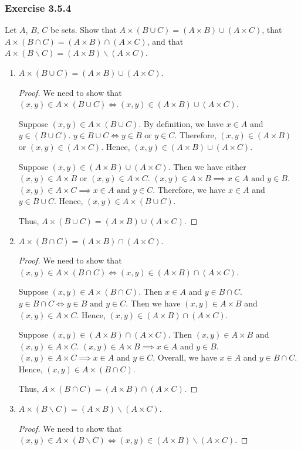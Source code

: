 \documentclass[12pt, letter]{article}
\begin{document}
\subsubsection*{Exercise 3.5.4}
Let $A$, $B$, $C$ be sets. Show that $A\times (B\cup C)=(A\times B)\cup (A\times C)$, that $A\times (B\cap C)=(A\times B)\cap (A\times C)$, and 
that $A\times (B\backslash C)=(A\times B)\backslash(A\times C)$.
\begin{enumerate}
    \item $A\times (B\cup C)=(A\times B)\cup (A\times C)$.
    \begin{proof}
        We need to show that $(x,y)\in A\times (B\cup C)\iff (x,y)\in (A\times B)\cup (A\times C)$.

        Suppose $(x,y)\in A\times (B\cup C)$. By definition, we have $x\in A$ and $y\in (B\cup C)$. $y\in B\cup C\iff y\in B\text{ or }y\in C$. 
        Therefore, $(x,y)\in (A\times B)$ or $(x,y)\in (A\times C)$. Hence, $(x,y)\in (A\times B)\cup (A\times C)$. 

        Suppose $(x,y)\in (A\times B)\cup (A\times C)$. Then we have either $(x,y)\in A\times B$ or $(x,y)\in A\times C$. 
        $(x,y)\in A\times B\implies x\in A\text{ and }y\in B$. $(x,y)\in A\times C\implies x\in A\text{ and }y\in C$. Therefore, we have $x\in A$ and $y\in B\cup C$. 
        Hence, $(x,y)\in A\times (B\cup C)$. 

        Thus, $A\times (B\cup C)=(A\times B)\cup (A\times C)$.
    \end{proof}
    \item $A\times (B\cap C)=(A\times B)\cap (A\times C)$.
    \begin{proof}
        We need to show that $(x,y)\in A\times (B\cap C)\iff (x,y)\in (A\times B)\cap (A\times C)$.

        Suppose $(x,y)\in A\times (B\cap C)$. Then $x\in A$ and $y\in B\cap C$. $y\in B\cap C\iff y\in B\text{ and }y\in C$. Then we have $(x,y)\in A\times B$ and 
        $(x,y)\in A\times C$. Hence, $(x,y)\in (A\times B)\cap (A\times C)$. 

        Suppose $(x,y)\in (A\times B)\cap (A\times C)$. Then $(x,y)\in A\times B$ and $(x,y)\in A\times C$. $(x,y)\in A\times B\implies x\in A$ and $y\in B$. 
        $(x,y)\in A\times C\implies x\in A$ and $y\in C$. Overall, we have $x\in A$ and $y\in B\cap C$. Hence, $(x,y)\in A\times (B\cap C)$.
        
        Thus, $A\times (B\cap C)=(A\times B)\cap (A\times C)$.
    \end{proof}
    \item $A\times (B\backslash C)=(A\times B)\backslash (A\times C)$.
    \begin{proof}
        We need to show that $(x,y)\in A\times (B\backslash C)\iff (x,y)\in (A\times B)\backslash (A\times C)$.


\end{proof}
\end{enumerate}
\end{document}
